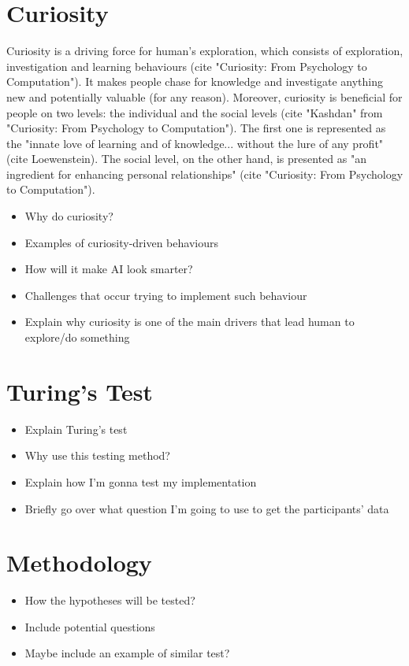 \documentclass[journal]{IEEEtran}
\begin{document}
\section{Curiosity}
Curiosity is a driving force for human's exploration, which consists of exploration, investigation and learning behaviours (cite "Curiosity: From Psychology to Computation"). It makes people chase for knowledge and investigate anything new and potentially valuable (for any reason). Moreover, curiosity is beneficial for people on two levels: the individual and the social levels (cite "Kashdan" from "Curiosity: From Psychology to Computation"). The first one is represented as the "innate love of learning and of knowledge... without the lure of any profit" (cite Loewenstein). The social level, on the other hand, is presented as "an ingredient for enhancing personal relationships" (cite "Curiosity: From Psychology to Computation").
\begin{itemize}
	\item Why do curiosity?
	\item Examples of curiosity-driven behaviours
	\item How will it make AI look smarter?
	\item Challenges that occur trying to implement such behaviour
	\item Explain why curiosity is one of the main drivers that lead human to explore/do something
\end{itemize}

\section{Turing's Test}
\begin{itemize}
	\item Explain Turing's test
	\item Why use this testing method?
	\item Explain how I'm gonna test my implementation
	\item Briefly go over what question I'm going to use to get the participants' data
\end{itemize}

\section{Methodology}
\begin{itemize}
	\item How the hypotheses will be tested?
	\item Include potential questions
	\item Maybe include an example of similar test?
\end{itemize}
\end{document}

